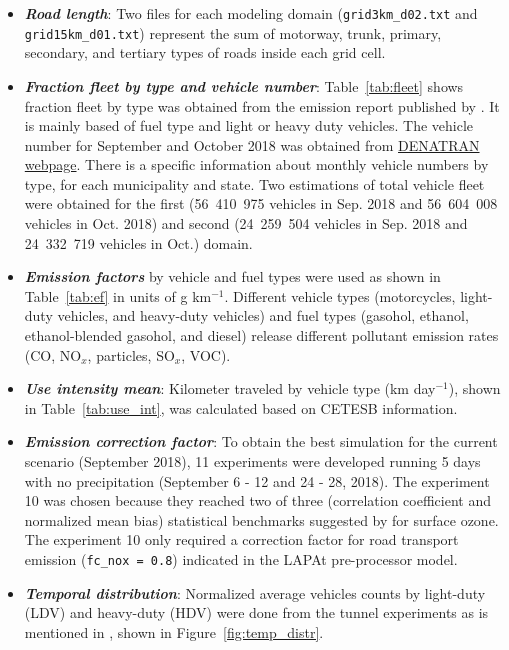 		\begin{itemize}
			\item \textbf{\textit{Road length}}: Two files for each modeling domain (\verb|grid3km_d02.txt| and \verb|grid15km_d01.txt|) represent the sum of motorway, trunk, primary, secondary, and tertiary types of roads inside each grid cell.
			\item \textbf{\textit{Fraction fleet by type and vehicle number}}: Table~\ref{tab:fleet} shows fraction fleet by type was obtained from the emission report published by \citet{CETESB2019a}. It is mainly based of fuel type and light or heavy duty vehicles. The vehicle number for September and October 2018 was obtained from  \href{https://www.gov.br/infraestrutura/pt-br/assuntos/transito/conteudo-denatran/frota-de-veiculos-2018}{DENATRAN webpage}. There is a specific information about monthly vehicle numbers by type, for each municipality and state. Two estimations of total vehicle fleet were obtained for the first (56~410~975 vehicles in Sep. 2018 and 56~604~008 vehicles in Oct. 2018) and second (24~259~504 vehicles in Sep. 2018 and 24~332~719 vehicles in Oct.) domain. 
			\item \textbf{\textit{Emission factors}} by vehicle and fuel types were used as shown in Table~\ref{tab:ef} in units of g km$^{-1}$. Different vehicle types (motorcycles, light-duty vehicles, and heavy-duty vehicles) and fuel types (gasohol, ethanol, ethanol-blended gasohol, and diesel) release different pollutant emission rates (CO, NO$_x$, particles, SO$_x$, VOC). 
			\item \textbf{\textit{Use intensity mean}}: Kilometer traveled by vehicle type (km day$^{-1}$), shown in Table~\ref{tab:use_int}, was calculated based on CETESB information. 
			\item \textbf{\textit{Emission correction factor}}: To obtain the best simulation for the current scenario (September 2018), 11 experiments were developed running 5 days with no precipitation (September 6 - 12 and 24 - 28, 2018). The experiment 10 was chosen because they reached two of three (correlation coefficient and normalized mean bias) statistical benchmarks suggested by \citet{Emery2017} for surface ozone. The experiment 10 only required a correction factor for road transport emission (\verb|fc_nox = 0.8|) indicated in the LAPAt pre-processor model.
			\item \textbf{\textit{Temporal distribution}}: Normalized average vehicles counts by light-duty (LDV) and heavy-duty (HDV) were done from the tunnel experiments as is mentioned in \citet{Andrade2015}, shown in Figure~\ref{fig:temp_distr}. 	

\end{itemize}
